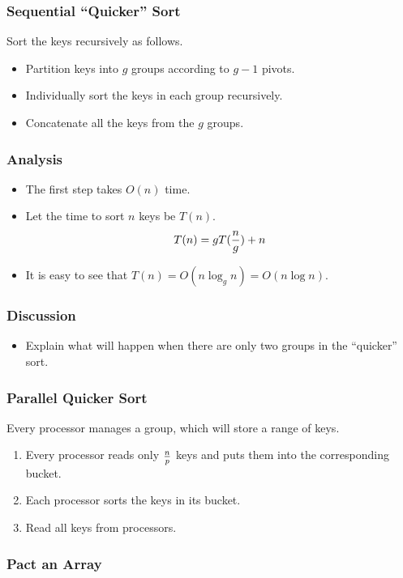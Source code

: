 \documentclass{beamer}
\begin{document}
\begin{CJK}{UTF8}{bsmi}
\begin{frame}
\frametitle{Sequential ``Quicker'' Sort}
Sort the keys recursively as follows.
\begin{itemize}
\item Partition keys into $g$ groups according to $g-1$ pivots.
\item Individually sort the keys in each group recursively.
\item Concatenate all the keys from the $g$ groups.
\end{itemize}
\end{frame}

\begin{frame}
\frametitle{Analysis}
\begin{itemize}
\item The first step takes $O(n)$ time.
\item Let the time to sort $n$ keys be $T(n)$.
\begin{equation}
T(n) = g T({n \over g}) + n
\end{equation}
\item It is easy to see that $T(n) = O(n \log_{g} n) = O(n \log n)$.
\end{itemize}
\end{frame}

\begin{frame}
\frametitle{Discussion}
\begin{itemize}
\item Explain what will happen when there are only two groups in the
  ``quicker'' sort.
\end{itemize}
\end{frame}

\begin{frame}
\frametitle{Parallel Quicker Sort}
Every processor manages a group, which will store a range of keys.
\begin{enumerate}
\item Every processor reads only $n \over p$ keys and puts them into the corresponding bucket.
\item Each processor sorts the keys in its bucket.
\item Read all keys from processors.
\end{enumerate}
\end{frame}

\begin{frame}
\frametitle{Pact an Array}
\centerline{}
\end{frame}


\end{CJK}
\end{document}
